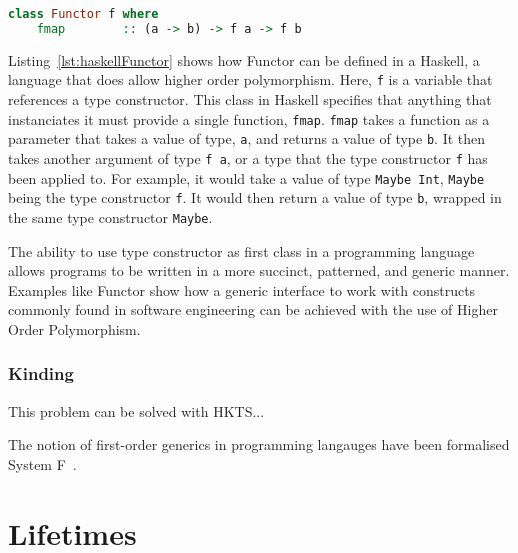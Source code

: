 \begin{lstlisting}[caption=Functor as defined in Haskell., language=Haskell, label={lst:haskellFunctor}]
class Functor f where
    fmap        :: (a -> b) -> f a -> f b
\end{lstlisting}

Listing~\ref{lst:haskellFunctor} shows how Functor can be defined in a Haskell,
a language that does allow higher order polymorphism. Here, \lstinline{f} is a
variable that references a type constructor. This class in Haskell specifies
that anything that instanciates it must provide a single function,
\lstinline{fmap}.  \lstinline{fmap} takes a function as a parameter that takes
a value of type, \lstinline{a}, and returns a value of type \lstinline{b}. It
then takes another argument of type \lstinline{f a}, or a type that the type
constructor \lstinline{f} has been applied to. For example, it would take a
value of type \lstinline{Maybe Int}, \lstinline{Maybe} being the type
constructor \lstinline{f}. It would then return a value of type \lstinline{b},
wrapped in the same type constructor \lstinline{Maybe}.

The ability to use type constructor as first class in a programming language
allows programs to be written in a more succinct, patterned, and generic manner.
Examples like Functor show how a generic interface to work with constructs
commonly found in software engineering can be achieved with the use of Higher
Order Polymorphism.

\subsubsection{Kinding}

This problem can be solved with HKTS...

The notion of first-order generics in programming langauges have been formalised
System F~\cite{higher}. 


\section{Lifetimes}
